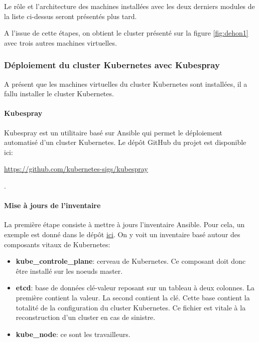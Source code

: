 \documentclass[12pt]{article}
\begin{document}
Le rôle et l'architecture des machines installées avec les deux derniers modules de la liste ci-dessus seront présentés plus tard.

A l'issue de cette étapes, on obtient le \gls{cluster} présenté sur la figure \ref{fig:dehon1} avec trois autres machines virtuelles.

\subsubsection{Déploiement du \gls{cluster} \gls{Kubernetes} avec \gls{Kubespray}}
A présent que les machines virtuelles du \gls{cluster} \gls{Kubernetes} sont installées, il a fallu installer le \gls{cluster} \gls{Kubernetes}.

\paragraph{\gls{Kubespray}}
\gls{Kubespray} est un utilitaire basé sur \gls{Ansible} qui permet le déploiement automatisé d'un \gls{cluster} \gls{Kubernetes}.
Le dépôt GitHub du projet est disponible ici: \\ \begin{hilite}\url{https://github.com/kubernetes-sigs/kubespray}\end{hilite}.

\paragraph{Mise à jours de l'inventaire}
La première étape consiste à mettre à jours l'inventaire \gls{Ansible}.
Pour cela, un exemple est donné dans le dépôt \href{https://github.com/kubernetes-sigs/kubespray/blob/master/inventory/sample/inventory.ini}{ici}.
On y voit un inventaire basé autour des composants vitaux de \gls{Kubernetes}:
\begin{itemize}
    \item \textbf{kube\_controle\_plane}: cerveau de \gls{Kubernetes}.
    Ce composant doit donc être installé sur les noeuds master.
    \item \textbf{etcd}: base de données clé-valeur reposant sur un tableau à deux colonnes.
    La première contient la valeur.
    La second contient la clé.
    Cette base contient la totalité de la configuration du \gls{cluster} \gls{Kubernetes}.
    Ce fichier est vitale à la reconstruction d'un \gls{cluster} en cas de sinistre.
    \item \textbf{kube\_node}: ce sont les travailleurs.
\end{itemize}
\end{document}
